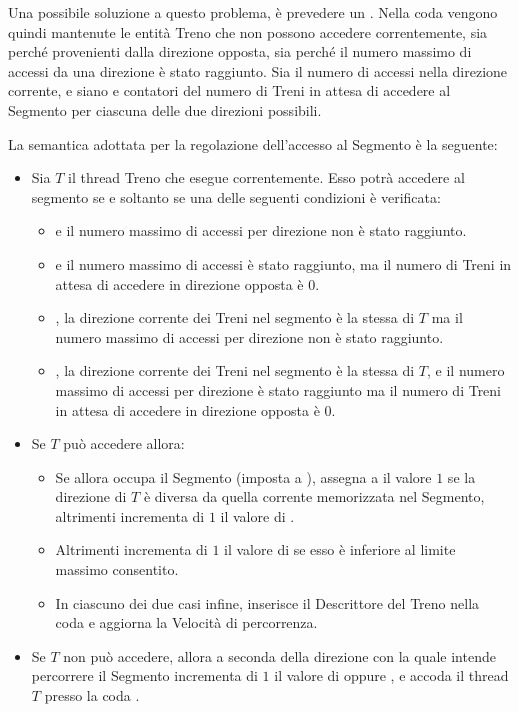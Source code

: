 \begin{description}
			Una possibile soluzione a questo problema, è prevedere un . Nella coda  vengono quindi mantenute  le entità Treno che non possono accedere correntemente, sia perché provenienti dalla direzione opposta, sia perché il numero massimo di accessi da una direzione è stato raggiunto. 
		Sia  il numero di accessi nella direzione corrente, e siano  e  contatori del numero di Treni in attesa di accedere al Segmento per ciascuna delle due direzioni possibili.
		
		La semantica adottata per la regolazione dell'accesso al Segmento è la seguente:
		\begin{itemize}
			\item Sia $T$ il thread Treno che esegue correntemente. Esso potrà accedere al segmento se e soltanto se una delle seguenti condizioni è verificata:
				\begin{itemize}
					\item {} e il numero massimo di accessi per direzione non è stato raggiunto.
					\item {} e il numero massimo di accessi è stato raggiunto, ma il numero di Treni in attesa di accedere in direzione opposta è 0.
					\item {}, la direzione corrente dei Treni nel segmento è la stessa di $T$ ma il numero massimo di accessi per direzione non è stato raggiunto.
					\item {}, la direzione corrente dei Treni nel segmento è la stessa di $T$, e il numero massimo di accessi per direzione è stato raggiunto ma il numero di Treni in attesa di accedere in direzione opposta è 0.
				\end{itemize}
			\item Se $T$ può accedere allora:
				\begin{itemize}
					\item Se  allora occupa il Segmento (imposta  a ), assegna a  il valore $1$ se la direzione di $T$ è diversa da quella corrente memorizzata nel Segmento, altrimenti incrementa di $1$ il valore di .
					\item Altrimenti incrementa di $1$ il valore di  se esso è inferiore al limite massimo consentito.
					\item In ciascuno dei due casi infine, inserisce il Descrittore del Treno nella coda  e aggiorna la Velocità di percorrenza.
				\end{itemize}
			\item Se $T$ non può accedere, allora a seconda della direzione con la quale intende percorrere il Segmento incrementa di $1$ il valore di  oppure , e accoda il thread $T$ presso la coda .
		\end{itemize}
			

\end{description}
